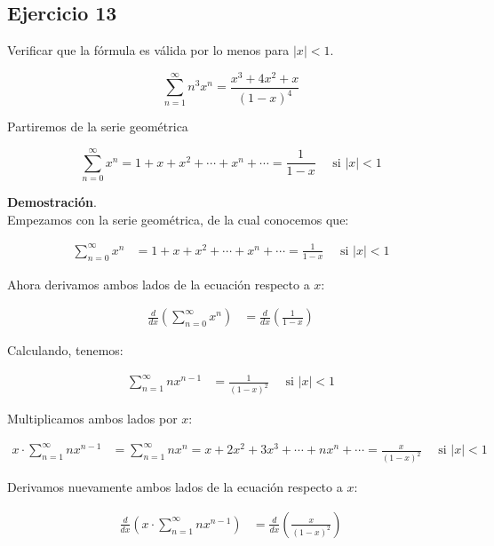 \documentclass{article}
\begin{document}
    \subsection*{Ejercicio 13}

    Verificar que la fórmula es válida por lo menos para $|x|<1$.

    $$
    \sum_{n=1}^{\infty} n^{3} x^{n}=\frac{x^{3}+4 x^{2}+x}{(1-x)^{4}}
    $$

    Partiremos de la serie geométrica

    $$
    \sum_{n=0}^{\infty} x^{n}=1+x+x^{2}+\cdots+x^{n}+\cdots=\frac{1}{1-x} \quad \text { si }|x|<1
    $$

    \textbf{Demostración}.\\

    Empezamos con la serie geométrica, de la cual conocemos que:

    \begin{align*}
        \sum_{n=0}^{\infty} x^{n} &= 1 + x + x^2 + \cdots + x^n + \cdots = \frac{1}{1-x} \quad \text{ si } |x| < 1
    \end{align*}

    Ahora derivamos ambos lados de la ecuación respecto a \(x\):

    \begin{align*}
        \frac{d}{dx} \left(\sum_{n=0}^{\infty} x^{n}\right) &= \frac{d}{dx} \left( \frac{1}{1-x} \right)
    \end{align*}

    Calculando, tenemos:

    \begin{align*}
        \sum_{n=1}^{\infty} nx^{n-1} &= \frac{1}{(1-x)^2} \quad \text{ si } |x| < 1
    \end{align*}

    Multiplicamos ambos lados por \(x\):

    \begin{align*}
        x \cdot \sum_{n=1}^{\infty} n x^{n-1} &= \sum_{n=1}^{\infty} n x^{n} = x + 2x^2 + 3x^3 + \cdots + nx^n + \cdots = \frac{x}{(1-x)^2} \quad \text{ si } |x| < 1
    \end{align*}

    Derivamos nuevamente ambos lados de la ecuación respecto a \(x\):

    \begin{align*}
        \frac{d}{dx} \left( x \cdot \sum_{n=1}^{\infty} nx^{n-1} \right) &= \frac{d}{dx} \left( \frac{x}{(1-x)^2} \right)
    \end{align*}
\end{document}
